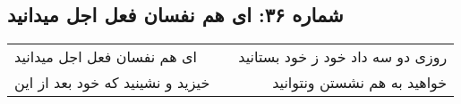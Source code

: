 \begin{center}
\section*{شماره ۳۶: ای هم نفسان فعل اجل میدانید}
\label{sec:036}
\begin{longtable}{l p{0.5cm} r}
ای هم نفسان فعل اجل میدانید
&&
روزی دو سه داد خود ز خود بستانید
\\
خیزید و نشینید که خود بعد از این
&&
خواهید به هم نشستن ونتوانید
\\
\end{longtable}
\end{center}
